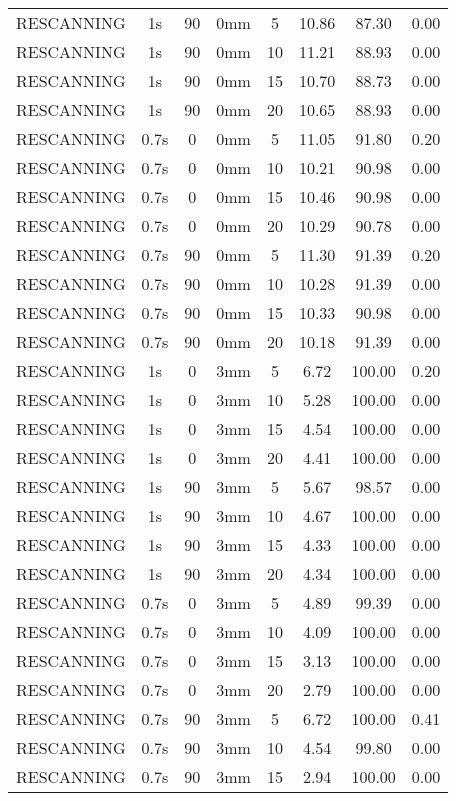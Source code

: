 \begin{table}[H]
\begin{tabular}{|c||c|c|c|c||c|c|c|}
RESCANNING & 1s & 90 & 0mm & 5 & 10.86 & 87.30 & 0.00 \\
RESCANNING & 1s & 90 & 0mm & 10 & 11.21 & 88.93 & 0.00 \\
RESCANNING & 1s & 90 & 0mm & 15 & 10.70 & 88.73 & 0.00 \\
RESCANNING & 1s & 90 & 0mm & 20 & 10.65 & 88.93 & 0.00 \\
RESCANNING & 0.7s & 0 & 0mm & 5 & 11.05 & 91.80 & 0.20 \\
RESCANNING & 0.7s & 0 & 0mm & 10 & 10.21 & 90.98 & 0.00 \\
RESCANNING & 0.7s & 0 & 0mm & 15 & 10.46 & 90.98 & 0.00 \\
RESCANNING & 0.7s & 0 & 0mm & 20 & 10.29 & 90.78 & 0.00 \\
RESCANNING & 0.7s & 90 & 0mm & 5 & 11.30 & 91.39 & 0.20 \\
RESCANNING & 0.7s & 90 & 0mm & 10 & 10.28 & 91.39 & 0.00 \\
RESCANNING & 0.7s & 90 & 0mm & 15 & 10.33 & 90.98 & 0.00 \\
RESCANNING & 0.7s & 90 & 0mm & 20 & 10.18 & 91.39 & 0.00 \\
RESCANNING & 1s & 0 & 3mm & 5 & 6.72 & 100.00 & 0.20 \\
RESCANNING & 1s & 0 & 3mm & 10 & 5.28 & 100.00 & 0.00 \\
RESCANNING & 1s & 0 & 3mm & 15 & 4.54 & 100.00 & 0.00 \\
RESCANNING & 1s & 0 & 3mm & 20 & 4.41 & 100.00 & 0.00 \\
RESCANNING & 1s & 90 & 3mm & 5 & 5.67 & 98.57 & 0.00 \\
RESCANNING & 1s & 90 & 3mm & 10 & 4.67 & 100.00 & 0.00 \\
RESCANNING & 1s & 90 & 3mm & 15 & 4.33 & 100.00 & 0.00 \\
RESCANNING & 1s & 90 & 3mm & 20 & 4.34 & 100.00 & 0.00 \\
RESCANNING & 0.7s & 0 & 3mm & 5 & 4.89 & 99.39 & 0.00 \\
RESCANNING & 0.7s & 0 & 3mm & 10 & 4.09 & 100.00 & 0.00 \\
RESCANNING & 0.7s & 0 & 3mm & 15 & 3.13 & 100.00 & 0.00 \\
RESCANNING & 0.7s & 0 & 3mm & 20 & 2.79 & 100.00 & 0.00 \\
RESCANNING & 0.7s & 90 & 3mm & 5 & 6.72 & 100.00 & 0.41 \\
RESCANNING & 0.7s & 90 & 3mm & 10 & 4.54 & 99.80 & 0.00 \\
RESCANNING & 0.7s & 90 & 3mm & 15 & 2.94 & 100.00 & 0.00 \\

\end{tabular}
\end{table}
